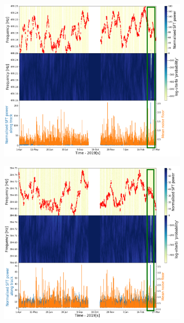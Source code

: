 \begin{figure}[hpt]
\begin{subfigure}[h]{0.49\textwidth}
	\includegraphics[width=\textwidth]{C6_detchar/linemixing/track_F470_15_470_25.pdf}
	\caption{\label{detchar:soap:calibrationlinemixing:3}}
\end{subfigure}
\begin{subfigure}[h]{0.49\textwidth}
	\includegraphics[width=\textwidth]{C6_detchar/linemixing/track_F394_65_394_75.pdf}
	\caption{\label{detchar:soap:calibrationlinemixing:4}}

\end{subfigure}
\end{figure}
